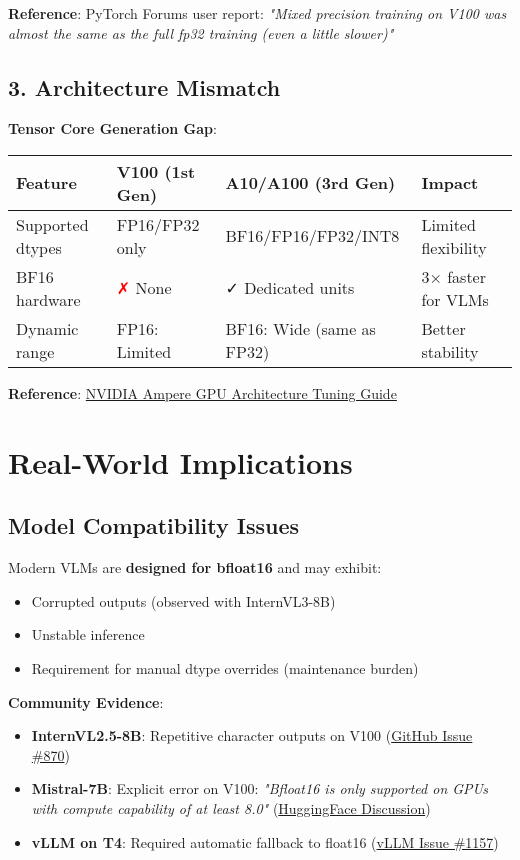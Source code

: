 \documentclass[11pt,a4paper]{article}
\newcommand{\cmark}{\textcolor{green!70!black}{✓}}
\newcommand{\xmark}{\textcolor{red}{✗}}
\begin{document}
\textbf{Reference}: PyTorch Forums user report: \textit{"Mixed precision training on V100 was almost the same as the full fp32 training (even a little slower)"}

\subsection{3. Architecture Mismatch}

\textbf{Tensor Core Generation Gap}:

\begin{table}[h]
\centering
\begin{tabular}{llll}
\toprule
\textbf{Feature} & \textbf{V100 (1st Gen)} & \textbf{A10/A100 (3rd Gen)} & \textbf{Impact} \\
\midrule
Supported dtypes & FP16/FP32 only & BF16/FP16/FP32/INT8 & Limited flexibility \\
BF16 hardware & \xmark{} None & \cmark{} Dedicated units & 3× faster for VLMs \\
Dynamic range & FP16: Limited & BF16: Wide (same as FP32) & Better stability \\
\bottomrule
\end{tabular}
\end{table}

\textbf{Reference}: \href{https://docs.nvidia.com/cuda/ampere-tuning-guide/}{NVIDIA Ampere GPU Architecture Tuning Guide}

\section{Real-World Implications}

\subsection{Model Compatibility Issues}

Modern VLMs are \textbf{designed for bfloat16} and may exhibit:
\begin{itemize}[leftmargin=*]
    \item Corrupted outputs (observed with InternVL3-8B)
    \item Unstable inference
    \item Requirement for manual dtype overrides (maintenance burden)
\end{itemize}

\textbf{Community Evidence}:
\begin{itemize}[leftmargin=*]
    \item \textbf{InternVL2.5-8B}: Repetitive character outputs on V100 (\href{https://github.com/OpenGVLab/InternVL/issues/870}{GitHub Issue \#870})
    \item \textbf{Mistral-7B}: Explicit error on V100: \textit{"Bfloat16 is only supported on GPUs with compute capability of at least 8.0"} (\href{https://huggingface.co/mistralai/Mistral-7B-Instruct-v0.2/discussions/58}{HuggingFace Discussion})
    \item \textbf{vLLM on T4}: Required automatic fallback to float16 (\href{https://github.com/vllm-project/vllm/issues/1157}{vLLM Issue \#1157})
\end{itemize}
\end{document}
